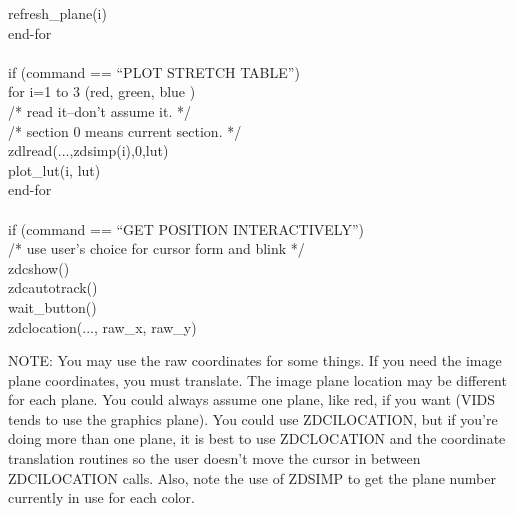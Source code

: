 \begin{tabbing}
\>\>\>\>\>refresh\_plane(i)\\
\>\>\>end-for\\
  \\
\>\>if (command == ``PLOT STRETCH TABLE'')\\
\>\>\>for i=1 to 3 (red, green, blue )\\
\>\>\>\>/*  read it--don't assume it.  */\\
\>\>\>\>/*  section 0 means current section.  */\\
\>\>\>\>zdlread(...,zdsimp(i),0,lut)\\
\>\>\>\>\>plot\_lut(i, lut)\\
\>\>\>end-for\\
  \\
\>\>if (command == ``GET POSITION INTERACTIVELY'')\\
\>\>\>/*  use user's choice for cursor form and blink  */\\
\>\>\>zdcshow()\\
\>\>\>zdcautotrack()\\
\>\>\>wait\_button()\\
\>\>\>zdclocation(..., raw\_x, raw\_y)\\
\end{tabbing}
NOTE:  You may use the raw coordinates for some things.  If you need
the image plane coordinates, you must translate.  The image plane
location may be different for each plane.  You could always assume one
plane, like red, if you want (VIDS tends to use the graphics
plane).  You could use ZDCILOCATION, but if you're doing more
than one plane, it is best to use ZDCLOCATION and the
coordinate translation routines so the user doesn't move the
cursor in between ZDCILOCATION calls.  Also, note the use
of ZDSIMP to get the plane number currently in use for each
color.
